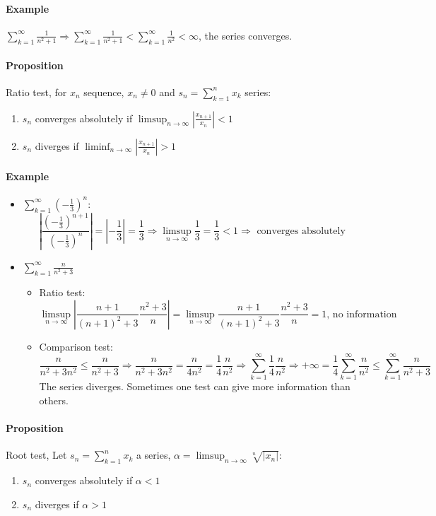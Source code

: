 \documentclass{article}
\newcommand{\abs}[1]{\left|#1\right|}
\newcommand{\limsupn}{\limsup_{n \to \infty}}
\newcommand{\liminfn}{\liminf_{n \to \infty}}
\newcommand{\DS}{\displaystyle}
\newcommand{\sumn}[1]{\sum_{k=1}^n #1}
\newcommand{\series}[1]{\sum_{k=1}^\infty #1}
\newcommand{\Proposition}{\paragraph{Proposition}}
\newcommand{\Example}{\paragraph{Example}}
\begin{document}
	\Example $\DS \series \frac{1}{n^2+1} \Rightarrow \series \frac{1}{n^2+1} <
	\series \frac{1}{n^2} < \infty$, the series converges.

	\Proposition Ratio test, for $x_n$ sequence, $x_n \neq 0$ and $\DS
	s_n = \sumn{x_k}$ series:
	\begin{enumerate}[label=(\roman*)]
		\item $s_n$ converges absolutely if $\limsupn \abs{\frac{x_{n+1}}{x_n}} < 1$
		\item $s_n$ diverges if $\liminfn \abs{\frac{x_{n+1}}{x_n}} > 1$
	\end{enumerate}

	\Example
	\begin{itemize}
		\item $\DS \series\left({-\frac{1}{3}}\right)^n$:
		\begin{equation*}
			\abs{\frac{(-\frac{1}{3})^{n+1}}{(-\frac{1}{3})^n}} = \abs{-\frac{1}{3}}
			= \frac{1}{3} \Rightarrow \limsupn \frac{1}{3} = \frac{1}{3} < 1
			\Rightarrow \text{ converges absolutely}
		\end{equation*}
		\item $\DS \series \frac{n}{n^2+3}$
			\begin{itemize}
				\item Ratio test:
				\begin{equation*}
					\limsupn \abs{\frac{n+1}{(n+1)^2+3}\frac{n^2+3}{n}} =
					\limsupn \frac{n+1}{(n+1)^2+3}\frac{n^2+3}{n} = 1 \text{, no information}
				\end{equation*}
				\item Comparison test:
				\begin{equation*}
					\frac{n}{n^2+3n^2} \leq \frac{n}{n^2+3} \Rightarrow
					\frac{n}{n^2+3n^2} = \frac{n}{4n^2} = \frac{1}{4} \frac{n}{n^2}
					\Rightarrow \series \frac{1}{4} \frac{n}{n^2} \Rightarrow
					+\infty = \frac{1}{4} \series \frac{n}{n^2} \leq \series \frac{n}{n^2+3}
				\end{equation*}
				The series diverges. Sometimes one test can give more information than
				others.
			\end{itemize}
	\end{itemize}

	\Proposition Root test, Let $\DS s_n = \sumn{x_k}$ a series, $\DS \alpha =
	\limsupn \sqrt[n]{\abs{x_n}}$:
	\begin{enumerate}[label=(\roman*)]
		\item $s_n$ converges absolutely if $\alpha < 1$
		\item $s_n$ diverges if $\alpha > 1$
	\end{enumerate}
\end{document}

